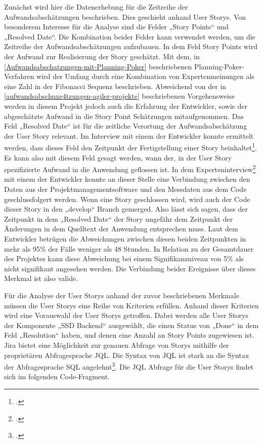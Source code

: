 Zunächst wird hier die Datenerhebung für die Zeitreihe der
Aufwandsabschätzungen beschrieben. Dies geschieht anhand User Storys. Von besonderem Interesse für die Analyse sind
die Felder „Story Points`` und „Resolved Date``. Die Kombination beider
Felder kann verwendet werden, um die Zeitreihe der Aufwandsabschätzungen
aufzubauen. In dem Feld Story Points wird der Aufwand zur Realisierung
der Story geschätzt. Mit dem, in \ref{Aufwandsabschatzungen-mit-Planning-Poker} beschriebenen
Planning-Poker-Verfahren wird der Umfang durch eine Kombination von
Expertenmeinungen als eine Zahl in der Fibonacci Sequenz beschrieben.
Abweichend von der in \ref{aufwandsabschuxe4tzungen-agiler-projekte} beschriebenen Vorgehensweise werden in diesem
Projekt jedoch auch die Erfahrung der Entwickler, sowie der abgeschätzte
Aufwand in die Story Point Schätzungen mitaufgenommen. Das Feld
„Resolved Date`` ist für die zeitliche Verortung der Aufwandsabschätzung
der User Story relevant. Im Interview mit einem der Entwickler konnte
ermittelt werden, dass dieses Feld den Zeitpunkt der Fertigstellung
einer Story beinhaltet\footcite[Vgl. ][]{entwicklerInterviewMitEntwickler2022}. Es kann also mit diesem Feld
gesagt werden, wann der, in der User Story spezifizierte Aufwand in die
Anwendung geflossen ist. In dem Experteninterview\footcite[Vgl. ][]{entwicklerInterviewMitEntwickler2022} mit einem der Entwickler konnte an dieser Stelle eine
Verbindung zwischen den Daten aus der Projektmanagementsoftware und den
Messdaten aus dem Code geschlussfolgert werden. Wenn eine Story
geschlossen wird, wird auch der Code dieser Story in den „develop``
Branch gemerged. Also lässt sich sagen, dass der Zeitpunkt in dem
„Resolved Date`` der Story ungefähr dem Zeitpunkt der Änderungen in dem
Quelltext der Anwendung entsprechen muss. Laut dem Entwickler betrügen
die Abweichungen zwischen diesen beiden Zeitpunkten in mehr als 95\% der
Fälle weniger als 48 Stunden. In Relation zu der Gesamtdauer des
Projektes kann diese Abweichung bei einem Signifikanzniveau von 5\% als
nicht signifikant angesehen werden. Die Verbindung beider Ereignisse
über dieses Merkmal ist also valide.

Für die Analyse der User Storys anhand der zuvor beschriebenen Merkmale
müssen die User Storys eine Reihe von Kriterien erfüllen. Anhand dieser
Kriterien wird eine Vorauswahl der User Storys getroffen. Dabei werden
alle User Storys der Komponente „SSD Backend`` ausgewählt, die einen
Status von „Done`` in dem Feld „Resolution`` haben, und denen eine
Anzahl an Story Points zugewiesen ist. Jira bietet eine Möglichkeit zur
genauen Abfrage von Storys mithilfe der proprietären Abfragesprache \ac{JQL}. Die Syntax von \ac{JQL} ist stark an die Syntax der
Abfragesprache \ac{SQL} angelehnt\footcite[Vgl. ][]{atlassianptyltdUseAdvancedSearch2022}.
Die \ac{JQL} Abfrage für die User Storys findet sich im folgenden Code-Fragment.

